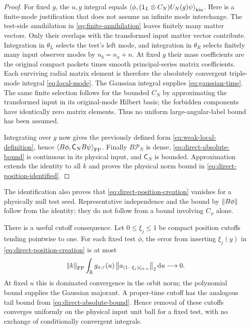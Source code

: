 \begin{proof}
For fixed $g$, the $u,y$ integral equals
$\left\langle\phi,(1_L\otimes C_N)U_N(g)\psi\right\rangle_{\rm kin}$.
Here is a finite-mode justification that does not assume an infinite
mode interchange. The test-side annihilation in
\eqref{eq:finite-annihilation} leaves finitely many matter vectors.
Only their overlaps with the transformed input matter vector contribute.
Integration in $\theta_L$ selects the test's left mode, and integration
in $\theta_R$ selects finitely many input observer modes by
$n_b=n_a+n$. At fixed $g$ their mass coefficients are the original
compact packets times smooth principal-series matrix coefficients.
Each surviving radial matrix element is therefore the absolutely
convergent triple-mode integral \eqref{eq:local-mode}.
The Gaussian integral supplies \eqref{eq:gaussian-time}.
The same finite selection follows for the bounded $C_N$ by
approximating the transformed input in its original-mode Hilbert basis;
the forbidden components have identically zero matrix elements.
Thus no uniform large-angular-label bound has been assumed.

Integrating over $g$ now gives the previously defined form
\eqref{eq:weak-local-definition}, hence
$\left\langle B\phi,\mathsf C_NB\psi\right\rangle_{\mathrm{FP}}$.
Finally $B\mathcal P_N$ is dense, \eqref{eq:direct-absolute-bound}
is continuous in its physical input, and $\mathsf C_N$ is bounded.
Approximation extends the identity to all $k$ and proves the physical
norm bound in \eqref{eq:direct-position-identified}.
\end{proof}

The identification also proves that \eqref{eq:direct-position-creation}
vanishes for a physically null test seed. Representative independence
and the bound by $\left\lVert B\phi\right\rVert$ follow from the identity; they do not
follow from a bound involving $C_\phi$ alone.

There is a useful cutoff consequence. Let $0\le\xi_j\le1$ be compact
position cutoffs tending pointwise to one. For each fixed test $\phi$,
the error from inserting $\xi_j(y)$ in
\eqref{eq:direct-position-creation} is at most
\begin{equation}
 \left\lVert k\right\rVert_{\mathrm{FP}}
 \int_{\mathbb R}g_{\sigma,\tau}(u)
       \left\lVert a_{(1-\xi_j)\zeta_{\phi,u}}\right\rVert_2\mathop{}\!\mathrm d u
 \longrightarrow0.
 \label{eq:position-cutoff-error}
\end{equation}
At fixed $u$ this is dominated convergence in the orbit norm; the
polynomial bound supplies the Gaussian majorant. A proper-time cutoff
has the analogous tail bound from \eqref{eq:direct-absolute-bound}.
Hence removal of these cutoffs converges uniformly on the physical
input unit ball for a fixed test, with no exchange of conditionally
convergent integrals.

